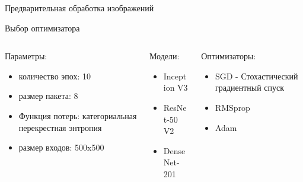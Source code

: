 \documentclass[aspectratio=169]{beamer}
\begin{document}
\begin{frame}{Предварительная обработка изображений}
    
\end{frame}

\begin{frame}{Выбор оптимизатора}
    \begin{columns}[T]
        \begin{column}{.3\paperwidth}
            Параметры:
            \begin{itemize}
                \item количество эпох: 10
                \item размер пакета: 8 
                \item Функция потерь: категориальная перекрестная энтропия 
                \item размер входов: 500x500
            \end{itemize}
        \end{column}
        \begin{column}{.2\paperwidth}
            Модели:            
            \begin{itemize}
                \item Inception V3
                \item ResNet-50 V2
                \item DenseNet-201
            \end{itemize} 
        \end{column}
        \begin{column}{.3\paperwidth}
            Оптимизаторы:
            \begin{itemize}
                \item SGD - Стохастический градиентный спуск
                \item RMSprop
                \item Adam
            \end{itemize} 
        \end{column}
    \end{columns}    
\end{frame}
\end{document}
